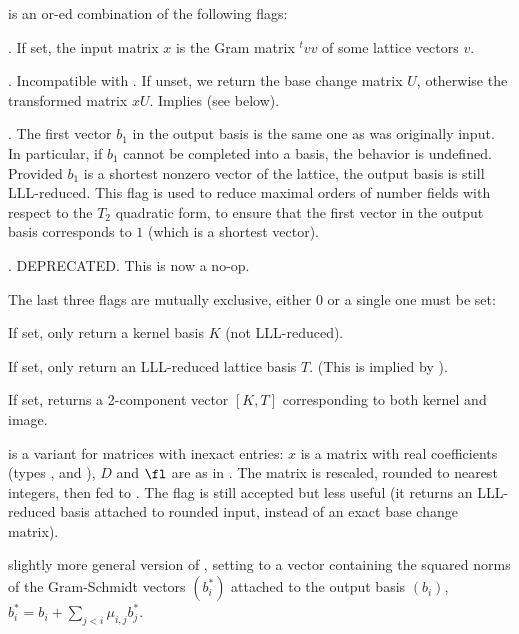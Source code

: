 \noindent{} is an or-ed combination of the following flags:

\item  {}. If set, the input matrix $x$ is the Gram matrix ${}^t
v v$ of some lattice vectors $v$.

\item  {}. Incompatible with . If unset, we
return the base change matrix $U$, otherwise the transformed matrix $x U$.
Implies  (see below).

\item  {}. The first vector $b_1$ in the output basis is
the same one as was originally input. In particular, if $b_1$
cannot be completed into a basis, the behavior is undefined. Provided $b_1$
is a shortest nonzero vector of the lattice, the output basis is still
LLL-reduced. This flag is used to reduce maximal orders of number fields with
respect to the $T_2$ quadratic form, to ensure that the first vector in the
output basis corresponds to $1$ (which is a shortest vector).

\item  {}. DEPRECATED. This is now a no-op.

The last three flags are mutually exclusive, either 0 or a single one must be
set:

\item  {} If set, only return a kernel basis $K$ (not LLL-reduced).

\item  {} If set, only return an LLL-reduced lattice basis $T$.
(This is implied by ).

\item  {} If set, returns a 2-component vector $[K, T]$
corresponding to both kernel and image.


 is a variant for matrices
with inexact entries: $x$ is a matrix with real coefficients (types
,  and ), $D$ and $\fl$ are as in .
The matrix is rescaled, rounded to nearest integers, then fed to
. The flag  is still accepted but less useful
(it returns an LLL-reduced basis attached to rounded input, instead of an
exact base change matrix).

 slightly more
general version of , setting  to a vector containing
the squared norms of the Gram-Schmidt vectors $(b_i^*)$ attached to the
output basis $(b_i)$, $b_i^* = b_i + \sum_{j < i} \mu_{i,j} b_j^*$.

